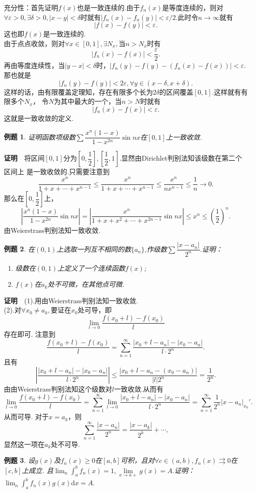 \documentclass[UTF8]{article}
\newcommand{\dx}{\mathrm{d}x}
\newcommand{\zm}{\textbf{证明}$\quad$}
\newtheorem{exa}{\hspace{2em}例题}[section]
\begin{document}
充分性：首先证明$f(x)$也是一致连续的.由于$f_n(x)$是等度连续的，则对$\forall\varepsilon>0,\exists\delta>0,
|x-y|<\delta$时就有$|f_n(x)-f_n(y)|<\varepsilon/2.$此时令$n\to\infty$就有
$$|f(x)-f(y)|<\varepsilon.$$这也即$f(x)$是一致连续的.\\
由于点点收敛，则对$\forall x\in[0,1],\exists N_x,$当$n>N_x$时有
$$|f_n(x)-f(x)|<\frac{\varepsilon}{2}.$$
再由等度连续性，当$|y-x|<\delta$时，$|f_n(y)-f(y)-(f_n(x)-f(x))|<\varepsilon.$那也就是
$$|f_n(y)-f(y)|<2\varepsilon,\forall y\in(x-\delta,x+\delta).$$
这样的话，由有限覆盖定理知，存在有限多个长为$2\delta$的区间覆盖$[0,1]$.这样就有有限多个$N_x$，
令$N$为其中最大的一个，当$n>N$时就有
$$|f_n(x)-f(x)|<\varepsilon.$$这就是一致收敛的定义.
\begin{exa}
  证明函数项级数$\sum\dfrac{x^n(1-x)}{1-x^{2n}}\sin nx$在$[0,1]$上一致收敛.
\end{exa}
\zm 将区间$[0,1]$分为$[0,\dfrac{1}{2}],[\dfrac{1}{2},1]$.显然由Dirichlet判别法知该级数在第二个区间上
是一致收敛的.只需要注意到
$$\dfrac{x^n}{1+x+\cdots+x^{n-1}}\le\dfrac{x^n}{1+x+\cdots+x^{n-1}}\le\dfrac{x^n}{nx^{n-1}}\le\dfrac{1}{n}\to0.$$
那么在$[0,\dfrac{1}{2}]$上，
$$\left|\frac{x^n(1-x)}{1-x^{2n}}\sin nx\right|=\left|\frac{x^n}{1+x+x^2+\cdots+x^{2n-1}}\sin nx\right|\le
x^n\le(\frac{1}{2})^n.$$
由Weierstrass判别法知一致收敛.
\begin{exa}
  在$(0,1)$上选取一列互不相同的数$\{a_n\}$,作级数$\sum\dfrac{|x-a_n|}{2^n}.$证明：
  \begin{enumerate}
    \item 级数在$(0,1)$上定义了一个连续函数$f(x)$;
    \item $f(x)$在$a_k$处不可微，在其他点可微.
  \end{enumerate}
\end{exa}
\zm (1).用由Weierstrass判别法知一致收敛.\\
(2).对$\forall x_0\ne a_k,$要证在$x_0$处可导，即
$$\lim_{l\to0}\frac{f(x_0+l)-f(x_0)}{l}$$存在即可.
注意到
$$\frac{f(x_0+l)-f(x_0)}{l}=\sum_{n=1}^\infty\frac{|x_0+l-a_n|-|x_0-a_n|}{l\cdot 2^n}.$$
且有
$$\left|\frac{|x_0+l-a_n|-|x_0-a_n|}{l\cdot 2^n}\right|\le\frac{|x_0+l-a_n-(x_0-a_n)|}{|l|2^n}=\frac{1}{2^n}.$$
由由Weierstrass判别法知这个级数对$l$一致收敛.从而有
$$\lim_{l\to0}\frac{f(x_0+l)-f(x_0)}{l}=\sum_{n=1}^\infty\lim_{l\to0}\frac{|x_0+l-a_n|-|x_0-a_n|}{l\cdot 2^n}
=\sum_{n=1}^\infty\frac{1}{2^n}|x-a_n|_{x_0}'.$$
从而可导.
对于$x=a_k$，则
$$\sum_{n=1}^\infty\frac{|x-a_n|}{2^n}=\frac{|x-a_k|}{2^k}+\cdots,$$
显然这一项在$a_k$处不可导.
\begin{exa}
  设$g(x)$及$f_n(x)\ge0$在$[a,b]$可积，且对$\forall c\in(a,b),f_n(x)\rightrightarrows 0$在$[c,b]$上成立.
  且$\lim_n\int_a^bf_n(x)=1,\lim\limits_{x\to a+}g(x)=A.$证明：$\lim_n\int_a^b f_n(x)g(x)\dx=A.$
\end{exa}
\end{document}
